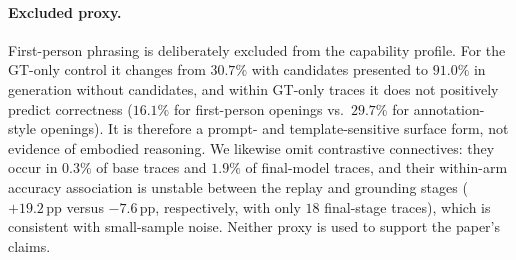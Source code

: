 \documentclass[letterpaper]{article}
\newcommand{\pp}{\,\mathrm{pp}}
\begin{document}
{\color{pendingred}
\paragraph{Excluded proxy.}
First-person phrasing is deliberately excluded from the capability profile.
For the GT-only control it changes from $30.7\%$ with candidates presented to
$91.0\%$ in generation without candidates, and within GT-only traces it does
not positively predict correctness ($16.1\%$ for first-person openings vs.\
$29.7\%$ for annotation-style openings).  It is therefore a prompt- and
template-sensitive surface form, not evidence of embodied reasoning.  We
likewise omit contrastive connectives: they occur in $0.3\%$ of base traces
and $1.9\%$ of final-model traces, and their within-arm accuracy association
is unstable between the replay and grounding stages ($+19.2\pp$ versus
$-7.6\pp$, respectively, with only $18$ final-stage traces), which is
consistent with small-sample noise.  Neither proxy is used to support the
paper's claims.
\par}
\end{document}
